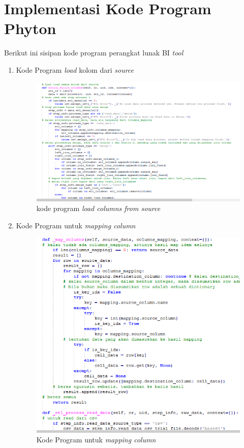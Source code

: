 	\section{Implementasi Kode Program Phyton}
	Berikut ini sisipan kode program perangkat lunak BI \textit{tool}
	\begin{enumerate}
		\item Kode Program \textit{load} kolom dari \textit{source}\\
		\begin{figure}[H]
		\centering
		\includegraphics[scale=0.5]{Gambar/kode-load}
		\caption{kode program \textit{load columns from source}}
		\end{figure}
	\item Kode Program untuk \textit{mapping column}
	\begin{figure}[H]
		\centering
		\includegraphics[scale=0.5]{Gambar/kode-mapping}
		\caption{Kode Program untuk \textit{mapping column}}
		\end{figure}
	\end{enumerate}
	
